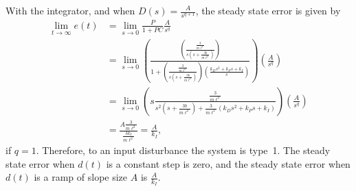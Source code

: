 With the integrator, and when $D(s)= \frac{A}{s^{q+1}}$, the steady state error is given by
\begin{align*}
\lim_{t\to\infty} e(t) &= \lim_{s\to 0} \frac{P}{1+PC}\frac{A}{s^q} \\
&= \lim_{s\to 0} \left(\frac{\left(\frac{\frac{3}{m\ell^2}}{s(s+\frac{3b}{m\ell^2})}\right)}{1+\left(\frac{\frac{3}{m\ell^2}}{s(s+\frac{3b}{m\ell^2})}\right)\left(\frac{k_Ds^2+k_Ps+k_I}{s}\right)}\right)\left(\frac{A}{s^q}\right) \\
&= \lim_{s\to 0} \left(s\frac{\frac{3}{m\ell^2}}{s^2(s+\frac{3b}{m\ell^2})+\frac{3}{m\ell^2}(k_Ds^2+k_Ps+k_I)}\right)\left(\frac{A}{s^q}\right) \\
&= \frac{A\frac{3}{m\ell^2}}{\frac{3k_I}{m\ell^2}} 
= \frac{A}{k_I},
\end{align*}
if $q=1$.  Therefore, to an input disturbance the system is type~1.  The steady state error when $d(t)$ is a constant step is zero, and the steady state error when $d(t)$ is a ramp of slope size $A$ is $\frac{A}{k_I}$.  
